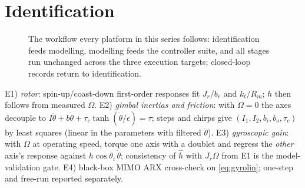 \documentclass[conference]{IEEEtran}
\begin{document}
\section{Identification}

\begin{figure}[!t]
\centering
{}
\caption{The workflow every platform in this series follows: identification feeds modelling, modelling feeds the controller suite, and all stages run unchanged across the three execution targets; closed-loop records return to identification.}
\label{fig:workflow}
\end{figure}
E1) \emph{rotor}: spin-up/coast-down first-order responses fit $J_r/b_r$ and $k_t/R_m$; $h$ then follows from measured $\Omega$. E2) \emph{gimbal inertias and friction}: with $\Omega = 0$ the axes decouple to $I\ddot\theta + b\dot\theta + \tau_c\tanh(\dot\theta/\epsilon) = \tau$; steps and chirps give $(I_1, I_2, b_i, b_o, \tau_c)$ by least squares (linear in the parameters with filtered $\ddot\theta$). E3) \emph{gyroscopic gain}: with $\Omega$ at operating speed, torque one axis with a doublet and regress the \emph{other} axis's response against $h\cos\theta_i\,\dot\theta$; consistency of $\hat h$ with $J_r\Omega$ from E1 is the model-validation gate. E4) black-box MIMO ARX cross-check on \eqref{eq:gyrolin}; one-step and free-run reported separately.
\end{document}
